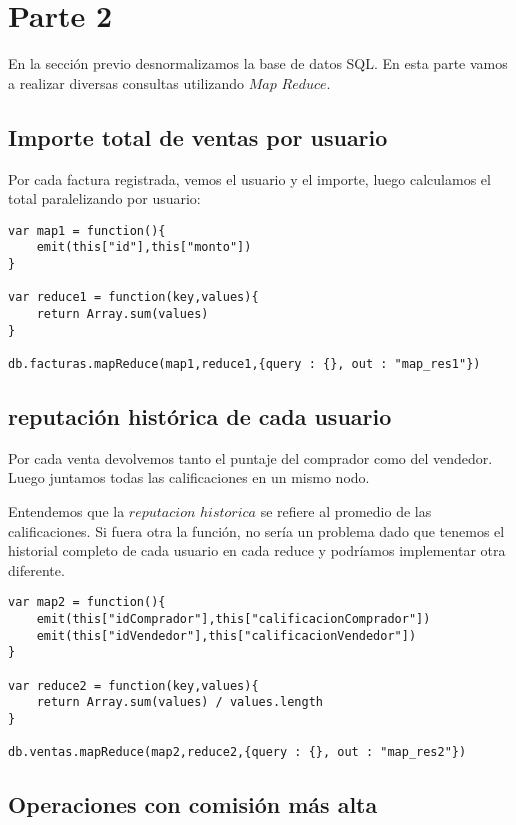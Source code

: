 \section{Parte 2}

En la sección previo desnormalizamos la base de datos SQL. En esta parte vamos a realizar diversas consultas utilizando $Map$ $Reduce$.

\subsection{Importe total de ventas por usuario}

Por cada factura registrada, vemos el usuario y el importe, luego calculamos el total paralelizando por usuario: \\

\begin{verbatim}
var map1 = function(){
    emit(this["id"],this["monto"])
}

var reduce1 = function(key,values){
    return Array.sum(values)
}

db.facturas.mapReduce(map1,reduce1,{query : {}, out : "map_res1"})
\end{verbatim}

\subsection{reputación histórica de cada usuario}
Por cada venta devolvemos tanto el puntaje del comprador como del vendedor. Luego juntamos todas las calificaciones en un mismo nodo.


Entendemos que la $reputacion$ $historica$ se refiere al promedio de las calificaciones. Si fuera otra la función, no sería un problema dado que tenemos el historial completo de cada usuario en cada reduce y podríamos implementar otra diferente.

\begin{verbatim}
var map2 = function(){
    emit(this["idComprador"],this["calificacionComprador"])
    emit(this["idVendedor"],this["calificacionVendedor"])
}

var reduce2 = function(key,values){
    return Array.sum(values) / values.length
}

db.ventas.mapReduce(map2,reduce2,{query : {}, out : "map_res2"})
\end{verbatim}

\subsection{Operaciones con comisión más alta}

